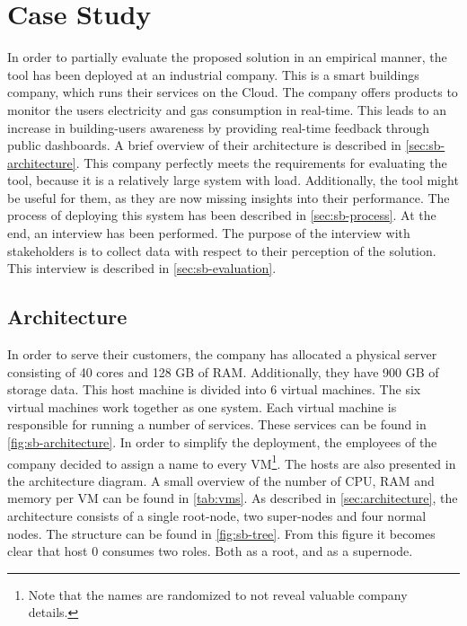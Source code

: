 \chapter{Case Study}\label{ch:case_study}
In order to partially evaluate the proposed solution in an empirical manner, the tool has been deployed at an industrial company. This is a smart buildings company, which runs their services on the Cloud. The company offers products to monitor the users electricity and gas consumption in real-time. This leads to an increase in building-users awareness by providing real-time feedback through public dashboards. A brief overview of their architecture is described in \autoref{sec:sb-architecture}. This company perfectly meets the requirements for evaluating the tool, because it is a relatively large system with load. Additionally, the tool might be useful for them, as they are now missing insights into their performance. The process of deploying this system has been described in \autoref{sec:sb-process}. At the end, an interview has been performed. The purpose of the interview with stakeholders is to collect data with respect to their perception of the solution. This interview is described in \autoref{sec:sb-evaluation}.

\section{Architecture} \label{sec:sb-architecture}
In order to serve their customers, the company has allocated a physical server consisting of 40 cores and 128 GB of RAM. Additionally, they have 900 GB of storage data. This host machine is divided into 6 virtual machines. The six virtual machines work together as one system. Each virtual machine is responsible for running a number of services. These services can be found in \autoref{fig:sb-architecture}. In order to simplify the deployment, the employees of the company decided to assign a name to every VM\footnote{Note that the names are randomized to not reveal valuable company details.}. The hosts are also presented in the architecture diagram. A small overview of the number of CPU, RAM and memory per VM can be found in \autoref{tab:vms}. As described in \autoref{sec:architecture}, the architecture consists of a single root-node, two super-nodes and four normal nodes. The structure can be found in \autoref{fig:sb-tree}. From this figure it becomes clear that host $0$ consumes two roles. Both as a root, and as a supernode.


